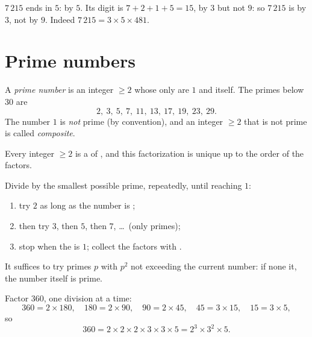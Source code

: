 \begin{example}
$7\,215$ ends in $5$:  by $5$. Its digit  is
$7 + 2 + 1 + 5 = 15$,  by $3$ but not $9$: so $7\,215$ is
 by $3$, not by $9$. Indeed $7\,215 = 3 \times 5 \times 481$.
\end{example}

\section{Prime numbers}

\begin{definition}\label{def:g9:arith:prime}
A \emph{prime number} is an integer $\geq 2$ whose
only  are $1$ and itself. The primes below $30$ are
\[
2,\ 3,\ 5,\ 7,\ 11,\ 13,\ 17,\ 19,\ 23,\ 29 .
\]
The number $1$ is \emph{not} prime (by convention), and an integer
$\geq 2$ that is not prime is called \emph{composite}.
\end{definition}

\begin{theorem}\label{thm:g9:arith:factorization}
Every integer $\geq 2$ is a  of , and this
factorization is unique up to the order of the factors.
\end{theorem}
\admitted

\begin{method}\label{met:g9:arith:factorization}
Divide by the smallest possible prime, repeatedly, until reaching $1$:
\begin{enumerate}
  \item try $2$ as long as the number is ;
  \item then try $3$, then $5$, then $7$, \dots\ (only primes);
  \item stop when the  is $1$; collect the factors with
        .
\end{enumerate}
It suffices to try primes $p$ with $p^2$ not exceeding the current
number: if none  it, the number itself is prime.
\end{method}

\begin{example}\label{ex:g9:arith:factorization}
Factor $360$, one division at a time:
\[
360 = 2 \times 180, \quad
180 = 2 \times 90, \quad
90 = 2 \times 45, \quad
45 = 3 \times 15, \quad
15 = 3 \times 5,
\]
so
\[
360 = 2 \times 2 \times 2 \times 3 \times 3 \times 5 = 2^3 \times 3^2
\times 5 .
\]
\end{example}

